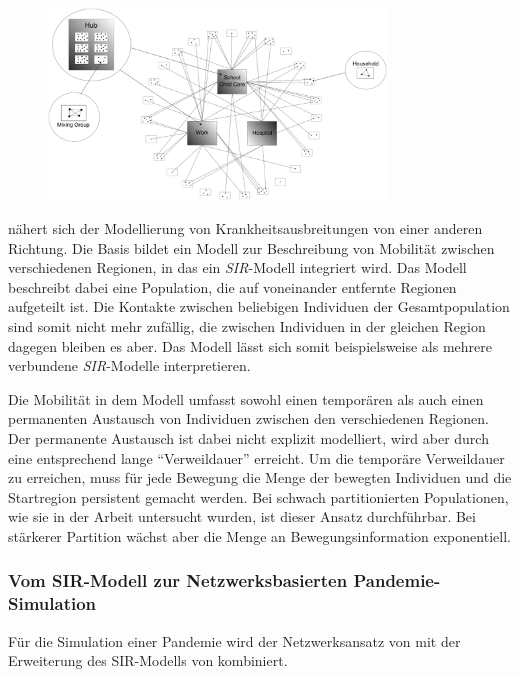 \begin{figure}
\includegraphics[width=0.8\textwidth]{res/diagramme/milne2008}
\caption{\cite[Figure 1. Idealised household and hub contact network]{Milne2008}}\label{fig:ssec:multipop:milne}
\end{figure}

\cite{Sattenspiel1995} nähert sich der Modellierung von Krankheitsausbreitungen von einer anderen Richtung. Die Basis bildet ein Modell zur Beschreibung von Mobilität zwischen verschiedenen Regionen, in das ein \emph{SIR}-Modell integriert wird. Das Modell beschreibt dabei eine Population, die auf voneinander entfernte Regionen aufgeteilt ist. Die Kontakte zwischen beliebigen Individuen der Gesamtpopulation sind somit nicht mehr zufällig, die zwischen Individuen in der gleichen Region dagegen bleiben es aber. Das Modell lässt sich somit beispielsweise als mehrere verbundene \emph{SIR}-Modelle interpretieren.

Die Mobilität in dem Modell umfasst sowohl einen temporären als auch einen permanenten Austausch von Individuen zwischen den verschiedenen Regionen. Der permanente Austausch ist dabei nicht explizit modelliert, wird aber durch eine entsprechend lange ``Verweildauer'' erreicht. Um die temporäre Verweildauer zu erreichen, muss für jede Bewegung die Menge der bewegten Individuen und die Startregion persistent gemacht werden. Bei schwach partitionierten Populationen, wie sie in der Arbeit untersucht wurden, ist dieser Ansatz durchführbar. Bei stärkerer Partition wächst aber die Menge an Bewegungsinformation exponentiell.
\subsubsection{Vom SIR-Modell zur Netzwerksbasierten Pandemie-Simulation}\steffen
Für die Simulation einer Pandemie wird der Netzwerksansatz von \citep{Milne2008} mit der Erweiterung des SIR-Modells von \citep{Sattenspiel1995} kombiniert. 

